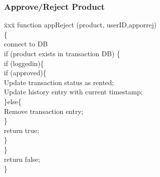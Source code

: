 \documentclass[11pt]{report}
\begin{document}
\begin{figure}[h]
\subsubsection{Approve/Reject Product}
\begin{tabbing}
\= xxx\= \kill
function appReject (product, userID,apporrej)\\
\{\\
\hspace{0.3in}connect to DB\\
\hspace{0.3in}if (product exists in transaction DB) \{\\
 \hspace{0.6in}if (loggedin)\{\\ 
\hspace{1.2in}if (approved)\{\\ 
\hspace{1.5in} Update transaction status as rented;\\
\hspace{1.5in}Update history entry with current timestamp;\\
\hspace{1.2in} \}else\{\\
\hspace{1.5in}Remove transaction entry;\\
\hspace{1.2in} \}\\
\hspace{1.2in}return true;\\
\hspace{0.6in} \}\\
\hspace{0.3in} \}\\
\hspace{0.3in}return false;\\
\}
\end{tabbing}
\end{figure}
\end{document}
